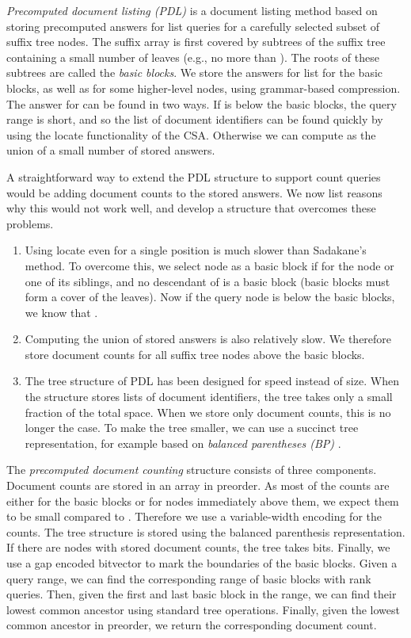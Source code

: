 \documentclass[11pt]{llncs}
\newcommand{\locate}{\textsf{locate}}
\newcommand{\rank}{\textsf{rank}}
\newcommand{\doccount}{\textsf{count}}
\newcommand{\doclist}{\textsf{list}}
\begin{document}
\emph{Precomputed document listing (PDL)} \cite{GKNPS13} is a document listing method based on storing precomputed answers for \doclist{} queries for a carefully selected subset of suffix tree nodes. The suffix array is first covered by subtrees of the suffix tree containing a small number of leaves (e.g., no more than ). The roots of these subtrees are called the \emph{basic blocks}. We store the answers for \doclist{} for the basic blocks, as well as for some higher-level nodes, using grammar-based compression. The answer for  can be found in two ways. If  is below the basic blocks, the query range is short, and so the list of document identifiers can be found quickly by using the \locate{} functionality of the CSA. Otherwise we can compute  as the union of a small number of stored answers.

A straightforward way to extend the PDL structure to support \doccount{} queries would be adding document counts to the stored answers. We now list reasons why this would not work well, and develop a structure that overcomes these problems.

\begin{enumerate}

\item Using \locate{} even for a single position is much slower than
Sadakane's method. To overcome this, we select node  as a basic block if
 for the node or one of its siblings, and no descendant of  is
a basic block (basic blocks must form a cover of the leaves). Now if the query node is below the basic blocks, we know that .

\item Computing the union of stored answers is also relatively slow. We therefore store document counts for all suffix tree nodes above the basic blocks.

\item The tree structure of PDL has been designed for speed instead of size.
When the structure stores lists of document identifiers, the tree takes only a
small fraction of the total space. When we store only document counts, this is
no longer the case. To make the tree smaller, we can use a succinct tree
representation, for example based on \emph{balanced
parentheses (BP)} \cite{MR02}.

\end{enumerate}

The \emph{precomputed document counting} structure consists of three components. Document counts are stored in an array in preorder. As most of the counts are either for the basic blocks or for nodes immediately above them, we expect them to be small compared to . Therefore we use a variable-width encoding for the counts. The tree structure is stored using the balanced parenthesis representation. If there are  nodes with stored document counts, the tree takes  bits. Finally, we use a gap encoded bitvector to mark the boundaries of the basic blocks. Given a query range, we can find the corresponding range of basic blocks with \rank{} queries. Then, given the first and last basic block in the range, we can find their lowest common ancestor using standard tree operations. Finally, given the lowest common ancestor in preorder, we return the corresponding document count.
\end{document}
